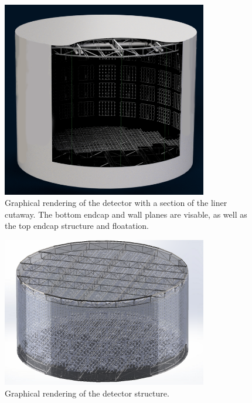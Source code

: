\begin{figure} %
    \includegraphics[width=0.8\textwidth]{diagrams/4-chips/chips_render_1.png}
    \caption[Graphical rendering of the \chipsfive detector with liner cutaway.]
    {Graphical rendering of the \chipsfive detector with a section of the liner cutaway.
        The bottom endcap and wall planes are visable,
        as well as the top endcap structure and floatation.}
    \label{fig:chips_render_1}
\end{figure} %

\begin{figure} %
    \includegraphics[width=0.8\textwidth]{diagrams/4-chips/chips_render_2.png}
    \caption[Graphical rendering of the \chipsfive detector structure.]
    {Graphical rendering of the \chipsfive detector structure.}
    \label{fig:chips_render_2}
\end{figure} %


